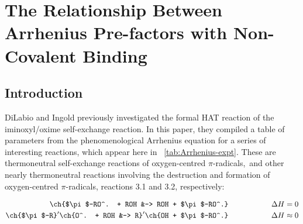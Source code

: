 
\chapter{The Relationship Between Arrhenius Pre-factors with Non-Covalent Binding}
\label{ch:arrhenius}

\section{Introduction}


DiLabio and Ingold\cite{DiLabio2005} previously investigated the formal HAT reaction of the iminoxyl/oxime self-exchange reaction. In this paper, they compiled a table of parameters from the phenomenological Arrhenius equation for a series of interesting reactions, which appear here in ~\ref{tab:Arrhenius-expt}.\cite{Kreilick1966, Mader2004, Mahoney1970, DaRooge1967, Howard1973, Foti1994, Chenier1974, Chenier1975} These are thermoneutral self-exchange reactions of oxygen-centred $\pi$-radicals,\footnotemark~and other nearly thermoneutral reactions involving the destruction and formation of oxygen-centred $\pi$-radicals, reactions 3.1 and 3.2, respectively:

\begin{align}
  \ch{$\pi$-RO^. + ROH &-> ROH + $\pi$-RO^.} \hspace{2cm} \Delta H = 0 \\
  \ch{$\pi$-R}^\prime\ch{O^. + ROH &-> R}^\prime\ch{OH + $\pi$-RO^.} \hspace{2cm} \Delta H \approx 0
\end{align}

\newcommand{\tabFig}[2][0.35]{\texttt{[image: figures/\#2.eps]}}

